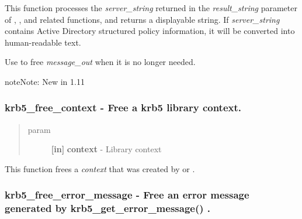 \documentclass[letterpaper,10pt,english]{sphinxmanual}
\begin{document}
This function processes the \emph{server\_string} returned in the \emph{result\_string} parameter of {\hyperref[appdev/refs/api/krb5_change_password:c.krb5_change_password]{}} , {\hyperref[appdev/refs/api/krb5_set_password:c.krb5_set_password]{}} , and related functions, and returns a displayable string. If \emph{server\_string} contains Active Directory structured policy information, it will be converted into human-readable text.

Use {\hyperref[appdev/refs/api/krb5_free_string:c.krb5_free_string]{}} to free \emph{message\_out} when it is no longer needed.

\begin{notice}{note}{Note:}
New in 1.11
\end{notice}


\subsubsection{krb5\_free\_context -  Free a krb5 library context.}
\label{appdev/refs/api/krb5_free_context:krb5-free-context-free-a-krb5-library-context}\label{appdev/refs/api/krb5_free_context::doc}

\begin{fulllineitems}
\label{appdev/refs/api/krb5_free_context:c.krb5_free_context}
\end{fulllineitems}

\begin{quote}\begin{description}
\item[{param}] \leavevmode
\textbf{{[}in{]}} \textbf{context} - Library context

\end{description}\end{quote}

This function frees a \emph{context} that was created by {\hyperref[appdev/refs/api/krb5_init_context:c.krb5_init_context]{}} or {\hyperref[appdev/refs/api/krb5_init_secure_context:c.krb5_init_secure_context]{}} .


\subsubsection{krb5\_free\_error\_message -  Free an error message generated by krb5\_get\_error\_message() .}
\label{appdev/refs/api/krb5_free_error_message:krb5-free-error-message-free-an-error-message-generated-by-krb5-get-error-message}\label{appdev/refs/api/krb5_free_error_message::doc}
\end{document}
